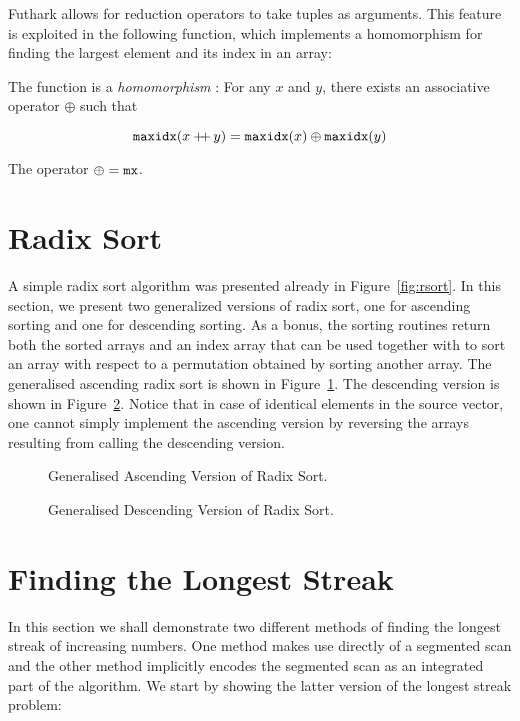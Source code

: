 \documentclass[oneside,11pt]{book}
\newcommand{\pp}{+\!\!\!+}
\begin{document}
Futhark allows for reduction operators to take tuples as
arguments. This feature is exploited in the following function, which
implements a homomorphism for finding the largest element and its
index in an array:



\noindent The function  is a \emph{homomorphism} \cite{BirdListTh}: For any
$x$ and $y$, there exists an associative operator $\oplus$ such that

$$\kw{maxidx}(x \pp\, y) = \kw{maxidx}(x) \oplus \kw{maxidx}(y)$$

\noindent
The operator $\oplus = \texttt{mx}$.

\section{Radix Sort}
A simple radix sort algorithm was presented already in
Figure~\ref{fig:rsort}. In this section, we present two generalized
versions of radix sort, one for ascending sorting and one for
descending sorting. As a bonus, the sorting routines return both the
sorted arrays and an index array that can be used together with
 to sort an array with respect to a permutation obtained by
sorting another array. The generalised ascending radix sort is shown
in Figure~\ref{fig:rsort_idx_asc}. The descending version is shown in
Figure~\ref{fig:rsort_idx_desc}. Notice that in case of identical
elements in the source vector, one cannot simply implement the
ascending version by reversing the arrays resulting from calling the
descending version.

\begin{figure}

\caption{Generalised Ascending Version of Radix Sort.}
\label{fig:rsort_idx_asc}
\end{figure}

\begin{figure}

\caption{Generalised Descending Version of Radix Sort.}
\label{fig:rsort_idx_desc}
\end{figure}


\section{Finding the Longest Streak}
In this section we shall demonstrate two different methods of finding
the longest streak of increasing numbers. One method makes use
directly of a segmented scan and the other method implicitly encodes
the segmented scan as an integrated part of the algorithm. We start by
showing the latter version of the longest streak problem:
\end{document}
